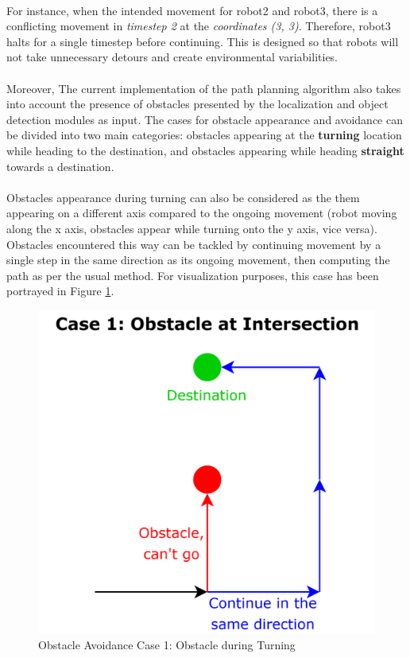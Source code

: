 \paragraph*{}
For instance, when the intended movement for robot2 and robot3, there is a conflicting movement in \textit{timestep 2} at the \textit{coordinates (3, 3)}. Therefore, robot3 halts for a single timestep before continuing. This is designed so that robots will not take unnecessary detours and create environmental variabilities.

\paragraph*{}
Moreover, The current implementation of the path planning algorithm also takes into account the presence of obstacles presented by the localization and object detection modules as input. The cases for obstacle appearance and avoidance can be divided into two main categories: obstacles appearing at the \textbf{turning} location while heading to the destination, and obstacles appearing while heading \textbf{straight} towards a destination.

\paragraph*{}
Obstacles appearance during turning can also be considered as the them appearing on a different axis compared to the ongoing movement (robot moving along the x axis, obstacles appear while turning onto the y axis, vice versa). Obstacles encountered this way can be tackled by continuing movement by a single step in the same direction as its ongoing movement, then computing the path as per the usual method. For visualization purposes, this case has been portrayed in Figure \ref{fig:obstacle-avoidance-case-1}.

\begin{figure} [H]
    \centering
    \includegraphics[width=0.55\linewidth]{assets/images/formation/obstacle-avoidance-case1.png}
    \caption{Obstacle Avoidance Case 1: Obstacle during Turning}
    \label{fig:obstacle-avoidance-case-1}
\end{figure}

